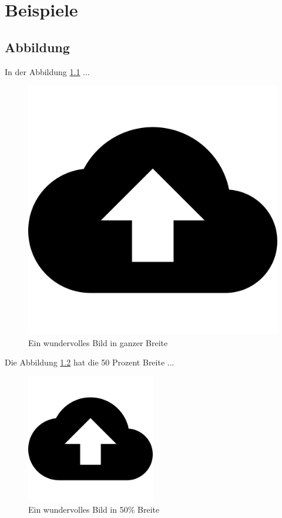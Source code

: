 \chapter{Beispiele}

\section{Abbildung}
In der Abbildung \ref{fig_example} ...

\begin{figure}[!h]
    \centering
    \includegraphics[width=\textwidth]{img/example_image.png}
    \caption{Ein wundervolles Bild in ganzer Breite}
    \label{fig_example}
\end{figure}

Die Abbildung \ref{fig_example_halfsize} hat die 50 Prozent Breite ...

\begin{figure}[h!]
    \centering
    \includegraphics[width=0.5\textwidth]{img/example_image.png}
    \caption[Kurzbeschreibung für Abbildungsverzeichnis]{Ein wundervolles Bild in 50\% Breite}
    \label{fig_example_halfsize}
\end{figure}

